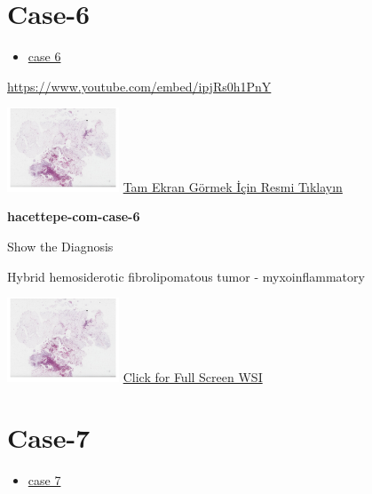 \documentclass[
  letterpaper,
  paper=6in:9in,
  pagesize=pdftex,
  headinclude=on,
  footinclude=on,
  12pt]{scrbook}
\providecommand{\tightlist}{%
  \setlength{\itemsep}{0pt}\setlength{\parskip}{0pt}}\usepackage{longtable,booktabs,array}
\begin{document}
\hypertarget{sec-hacettepe-case-of-the-month-case-6}{%
\section{Case-6}\label{sec-hacettepe-case-of-the-month-case-6}}

\begin{itemize}
\tightlist
\item
  \href{https://www.youtube.com/watch?v=ipjRs0h1PnY\&ab_channel=KemalKosemehmetoglu}{case
  6}
\end{itemize}

\url{https://www.youtube.com/embed/ipjRs0h1PnY}

\href{https://images.patolojiatlasi.com/hacettepe-com-case-6/HE.html}{\includegraphics[width=0.25\textwidth,height=\textheight]{./screenshots/hacettepe-com-case-6_screenshot.png}}
\href{https://images.patolojiatlasi.com/hacettepe-com-case-6/HE.html}{Tam
Ekran Görmek İçin Resmi Tıklayın}

\textbf{hacettepe-com-case-6}

Show the Diagnosis

\hypertarget{answer6}{}
Hybrid hemosiderotic fibrolipomatous tumor - myxoinflammatory

\href{https://images.patolojiatlasi.com/hacettepe-com-case-6/HE.html}{\includegraphics[width=0.25\textwidth,height=\textheight]{./screenshots/hacettepe-com-case-6_screenshot.png}}
\href{https://images.patolojiatlasi.com/hacettepe-com-case-6/HE.html}{Click
for Full Screen WSI}

\hypertarget{sec-hacettepe-case-of-the-month-case-7}{%
\section{Case-7}\label{sec-hacettepe-case-of-the-month-case-7}}

\begin{itemize}
\tightlist
\item
  \href{https://www.youtube.com/watch?v=FU-Fv7kQPdE\&ab_channel=KemalKosemehmetoglu}{case
  7}
\end{itemize}
\end{document}
